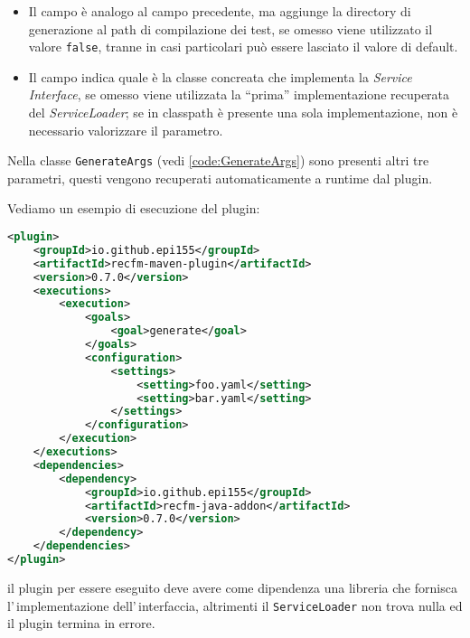\documentclass[a4paper,10pt]{report}
\begin{document}
\begin{itemize}
\item {}
	Il campo  è 
	analogo al campo precedente, ma aggiunge la directory di generazione al path 
	di compilazione dei test, se omesso viene utilizzato il valore \verb!false!, 
	tranne in casi particolari può essere lasciato il valore di default.
\item {}
	Il campo  indica 
	quale è la classe concreata che implementa la \textsl{Service Interface}, se 
	omesso viene utilizzata la ``prima'' implementazione recuperata del 
	\textsl{ServiceLoader}; se in classpath è presente una sola implementazione, 
	non è necessario valorizzare il parametro. 
\end{itemize}
Nella classe \verb!GenerateArgs! (vedi \ref{code:GenerateArgs}) sono presenti 
altri tre parametri, questi vengono recuperati automaticamente a runtime dal 
plugin.

Vediamo un esempio di esecuzione del plugin:

\begin{lstlisting}[language=XML, caption=esempio minimale di esecuzione del 
plugin, label=code:spring-conf]
<plugin>
    <groupId>io.github.epi155</groupId>
    <artifactId>recfm-maven-plugin</artifactId>
    <version>0.7.0</version>
    <executions>
        <execution>
            <goals>
                <goal>generate</goal>
            </goals>
            <configuration>
                <settings>
                    <setting>foo.yaml</setting>
                    <setting>bar.yaml</setting>
                </settings>
            </configuration>
        </execution>
    </executions>
    <dependencies>
        <dependency>
            <groupId>io.github.epi155</groupId>
            <artifactId>recfm-java-addon</artifactId>
            <version>0.7.0</version>
        </dependency>
    </dependencies>
</plugin>
\end{lstlisting}
il plugin per essere eseguito deve avere come dipendenza una libreria che 
fornisca l'\,implementazione dell'\,inter\-fac\-cia, altrimenti il 
\verb!ServiceLoader! non trova nulla ed il plugin termina in errore.
\end{document}

